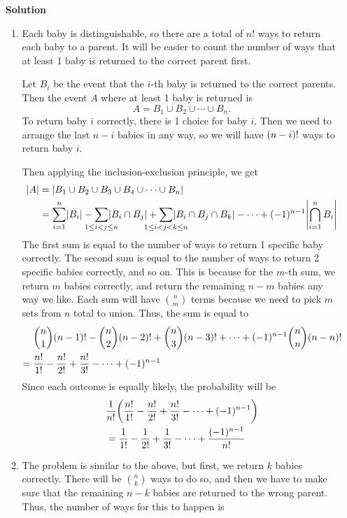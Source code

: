 \documentclass{article}
\DeclarePairedDelimiter{\paren}{(}{)}
\DeclarePairedDelimiter{\norm}{|}{|}
\newenvironment{multipart}
{
	\begin{enumerate}[leftmargin = *, align = left, label = {\alph*.}, topsep = 0pt]
}	
{
	\end{enumerate}
}
\newenvironment{solution}    %
{
	\begin{enumerate}[leftmargin = 0in]
		\item[\bfseries{Solution}]
}
{
	\end{enumerate}
}
\begin{document}
	\begin{solution}
		\begin{multipart}
			\item Each baby is distinguishable, so there are a total of $n!$ ways to return each baby to a parent. It will be easier to count the number of ways that at least 1 baby is returned to the correct parent first.
	
				Let $B_i$ be the event that the $i$-th baby is returned to the correct parents. Then the event $A$ where at least 1 baby is returned is \[ A = B_1 \cup B_2 \cup \cdots \cup B_n. \] To return baby $i$ correctly, there is 1 choice for baby $i$. Then we need to arrange the last $n - i$ babies in any way, so we will have $\paren{n - i}!$ ways to return baby $i$.
				
				Then applying the inclusion-exclusion principle, we get
				\begin{align*}
					\norm{A} &= \norm{B_1 \cup B_2 \cup B_3 \cup B_4 \cup \cdots \cup B_n} \\
					&= \sum_{i = 1}^{n} \norm{B_i} - \sum_{\mathclap{1 \leq i < j \leq n}} \norm{B_i \cap B_j} + \sum_{\mathclap{1 \leq i < j < k \leq n}} \norm{B_i \cap B_j \cap B_k} - \cdots + \paren{-1}^{n-1} \norm*{\bigcap_{i = 1}^n B_i}
				\end{align*}
				The first sum is equal to the number of ways to return 1 specific baby correctly. The second sum is equal to the number of ways to return 2 specific babies correctly, and so on. This is because for the $m$-th sum, we return $m$ babies correctly, and return the remaining $n - m$ babies any way we like. Each sum will have $\binom{n}{m}$ terms because we need to pick $m$ sets from $n$ total to union. Thus, the sum is equal to
				\begin{align*}
					&\binom{n}{1}\paren{n - 1}! - \binom{n}{2}\paren{n - 2}! + \binom{n}{3}\paren{n - 3}! + \cdots + \paren{-1}^{n-1} \binom{n}{n} \paren{n - n}! \\
					={}& \frac{n!}{1!} - \frac{n!}{2!} + \frac{n!}{3!} - \cdots + \paren{-1}^{n-1}
				\end{align*}
				Since each outcome is equally likely, the probability will be
				\begin{align*}
					&\frac{1}{n!} \paren*{\frac{n!}{1!} - \frac{n!}{2!} + \frac{n!}{3!} - \cdots + \paren{-1}^{n-1}} \\
					&= \frac{1}{1!} - \frac{1}{2!} + \frac{1}{3!} - \cdots + \frac{\paren{-1}^{n-1}}{n!}
				\end{align*}
			\item The problem is similar to the above, but first, we return $k$ babies correctly. There will be $\binom{n}{k}$ ways to do so, and then we have to make sure that the remaining $n - k$ babies are returned to the wrong parent. Thus, the number of ways for this to happen is

\end{multipart}
\end{solution}
\end{document}
